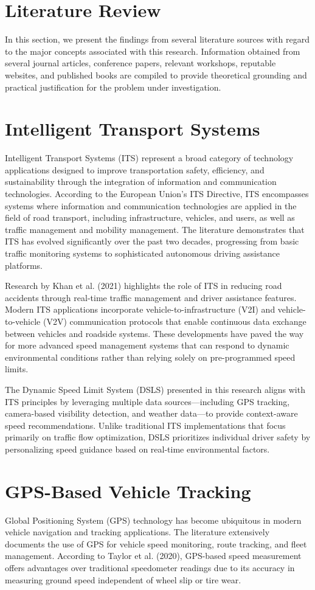 \section{Literature Review}
In this section, we present the findings from several literature sources with regard to the major concepts associated with this research. Information obtained from several journal articles, conference papers, relevant workshops, reputable websites, and published books are compiled to provide theoretical grounding and practical justification for the problem under investigation.
\section{Intelligent Transport Systems}
Intelligent Transport Systems (ITS) represent a broad category of technology applications designed to improve transportation safety, efficiency, and sustainability through the integration of information and communication technologies. According to the European Union's ITS Directive, ITS encompasses systems where information and communication technologies are applied in the field of road transport, including infrastructure, vehicles, and users, as well as traffic management and mobility management. The literature demonstrates that ITS has evolved significantly over the past two decades, progressing from basic traffic monitoring systems to sophisticated autonomous driving assistance platforms.

Research by Khan et al. (2021) highlights the role of ITS in reducing road accidents through real-time traffic management and driver assistance features. Modern ITS applications incorporate vehicle-to-infrastructure (V2I) and vehicle-to-vehicle (V2V) communication protocols that enable continuous data exchange between vehicles and roadside systems. These developments have paved the way for more advanced speed management systems that can respond to dynamic environmental conditions rather than relying solely on pre-programmed speed limits.

The Dynamic Speed Limit System (DSLS) presented in this research aligns with ITS principles by leveraging multiple data sources—including GPS tracking, camera-based visibility detection, and weather data—to provide context-aware speed recommendations. Unlike traditional ITS implementations that focus primarily on traffic flow optimization, DSLS prioritizes individual driver safety by personalizing speed guidance based on real-time environmental factors.

\section{GPS-Based Vehicle Tracking}
Global Positioning System (GPS) technology has become ubiquitous in modern vehicle navigation and tracking applications. The literature extensively documents the use of GPS for vehicle speed monitoring, route tracking, and fleet management. According to Taylor et al. (2020), GPS-based speed measurement offers advantages over traditional speedometer readings due to its accuracy in measuring ground speed independent of wheel slip or tire wear.

